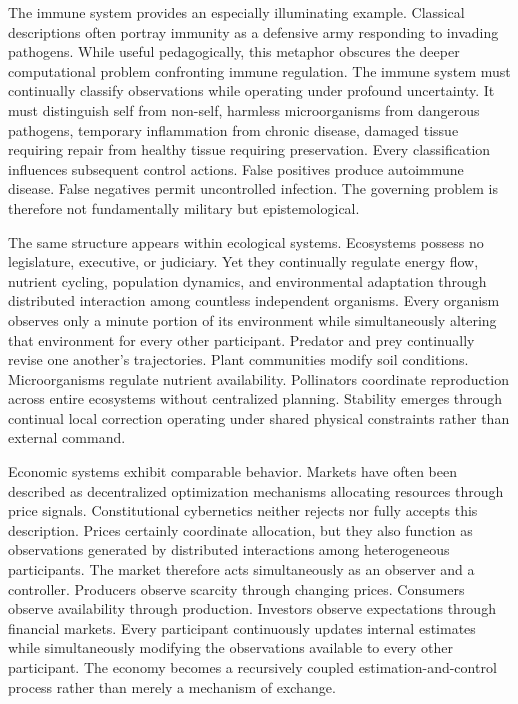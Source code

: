 \documentclass[12pt,a4paper]{article}
\begin{document}
The immune system provides an especially illuminating example. Classical descriptions often portray immunity as a defensive army responding to invading pathogens. While useful pedagogically, this metaphor obscures the deeper computational problem confronting immune regulation. The immune system must continually classify observations while operating under profound uncertainty. It must distinguish self from non-self, harmless microorganisms from dangerous pathogens, temporary inflammation from chronic disease, damaged tissue requiring repair from healthy tissue requiring preservation. Every classification influences subsequent control actions. False positives produce autoimmune disease. False negatives permit uncontrolled infection. The governing problem is therefore not fundamentally military but epistemological.

The same structure appears within ecological systems. Ecosystems possess no legislature, executive, or judiciary. Yet they continually regulate energy flow, nutrient cycling, population dynamics, and environmental adaptation through distributed interaction among countless independent organisms. Every organism observes only a minute portion of its environment while simultaneously altering that environment for every other participant. Predator and prey continually revise one another's trajectories. Plant communities modify soil conditions. Microorganisms regulate nutrient availability. Pollinators coordinate reproduction across entire ecosystems without centralized planning. Stability emerges through continual local correction operating under shared physical constraints rather than external command.

Economic systems exhibit comparable behavior. Markets have often been described as decentralized optimization mechanisms allocating resources through price signals. Constitutional cybernetics neither rejects nor fully accepts this description. Prices certainly coordinate allocation, but they also function as observations generated by distributed interactions among heterogeneous participants. The market therefore acts simultaneously as an observer and a controller. Producers observe scarcity through changing prices. Consumers observe availability through production. Investors observe expectations through financial markets. Every participant continuously updates internal estimates while simultaneously modifying the observations available to every other participant. The economy becomes a recursively coupled estimation-and-control process rather than merely a mechanism of exchange.
\end{document}
